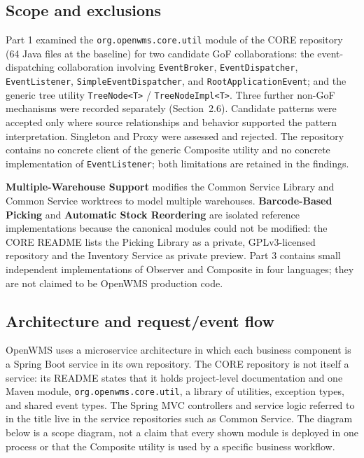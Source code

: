\documentclass[11pt,a4paper]{article}
\newcommand{\code}[1]{\nolinkurl{#1}}
\begin{document}
\subsection{Scope and exclusions}
Part 1 examined the \code{org.openwms.core.util} module of the CORE repository (64 Java files at the baseline) for two candidate GoF collaborations: the event-dispatching collaboration involving \code{EventBroker}, \code{EventDispatcher}, \code{EventListener}, \code{SimpleEventDispatcher}, and \code{RootApplicationEvent}; and the generic tree utility \code{TreeNode<T>} / \code{TreeNodeImpl<T>}. Three further non-GoF mechanisms were recorded separately (Section~2.6). Candidate patterns were accepted only where source relationships and behavior supported the pattern interpretation. Singleton and Proxy were assessed and rejected. The repository contains no concrete client of the generic Composite utility and no concrete implementation of \code{EventListener}; both limitations are retained in the findings.

\textbf{Multiple-Warehouse Support} modifies the Common Service Library and Common Service worktrees to model multiple warehouses. \textbf{Barcode-Based Picking} and \textbf{Automatic Stock Reordering} are isolated reference implementations because the canonical modules could not be modified: the CORE README lists the Picking Library as a private, GPLv3-licensed repository and the Inventory Service as private preview. Part 3 contains small independent implementations of Observer and Composite in four languages; they are not claimed to be OpenWMS production code.

\subsection{Architecture and request/event flow}
OpenWMS uses a microservice architecture in which each business component is a Spring Boot service in its own repository. The CORE repository is not itself a service: its README states that it holds project-level documentation and one Maven module, \code{org.openwms.core.util}, a library of utilities, exception types, and shared event types. The Spring MVC controllers and service logic referred to in the title live in the service repositories such as Common Service. The diagram below is a scope diagram, not a claim that every shown module is deployed in one process or that the Composite utility is used by a specific business workflow.
\end{document}
